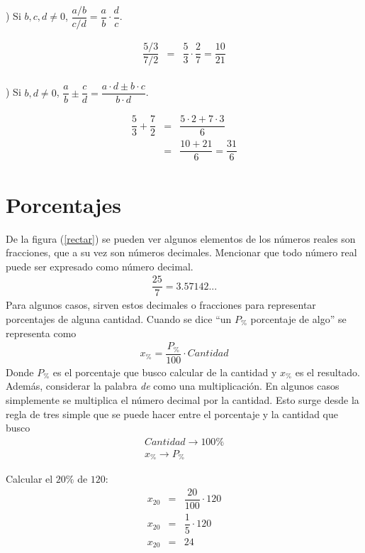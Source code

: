 ) Si $b,c,d\neq 0$, $\dfrac{a/b}{c/d}=\dfrac{a}{b}\cdot\dfrac{d}{c}$. \\
\begin{myexample}
\begin{eqnarray*}
\dfrac{5/3}{7/2}&=&\dfrac{5}{3}\cdot\dfrac{2}{7}=\dfrac{10}{21} \\
\end{eqnarray*}
\end{myexample}
) Si $b,d\neq 0$, $\dfrac{a}{b}\pm\dfrac{c}{d}=\dfrac{a\cdot d\pm b\cdot c}{b\cdot d}$. \\

\begin{myexample}
\begin{eqnarray*}
\dfrac{5}{3}+\dfrac{7}{2}&=&\dfrac{5\cdot 2+7\cdot 3}{6} \\
&=& \dfrac{10+21}{6}=\dfrac{31}{6}
\end{eqnarray*}
\end{myexample}
\section{Porcentajes}
De la figura (\ref{rectar}) se  pueden ver algunos elementos de los números reales son fracciones, que a su vez son números decimales. Mencionar que todo número real puede ser expresado como número decimal.
\begin{eqnarray*}
\dfrac{25}{7}=3.57142...
\end{eqnarray*}
Para algunos casos, sirven estos decimales o fracciones para representar porcentajes de  alguna cantidad. Cuando se dice ``un $P_{\%}$ porcentaje de algo'' se representa como
\begin{eqnarray}
x_{\%}=\dfrac{P_{\%}}{100}\cdot Cantidad
\end{eqnarray} 
Donde $P_{\%}$ es el porcentaje que busco calcular de la cantidad y $x_{\%}$ es el resultado. Además, considerar la palabra \textit{de} como una multiplicación. En algunos casos simplemente se multiplica el número decimal por la cantidad. Esto surge desde la regla de tres simple que se puede hacer entre el porcentaje y la cantidad que busco
\begin{eqnarray}
Cantidad\rightarrow 100\% \nonumber \\
x_{\%} \rightarrow P_{\%} \nonumber
\end{eqnarray}

\begin{myexample}
Calcular el $20\%$ de $120$:
\begin{eqnarray*}
x_{20}&=&\dfrac{20}{100}\cdot 120\\
x_{20}&=&\dfrac{1}{5}\cdot 120\\
x_{20}&=&24
\end{eqnarray*}
\end{myexample}

